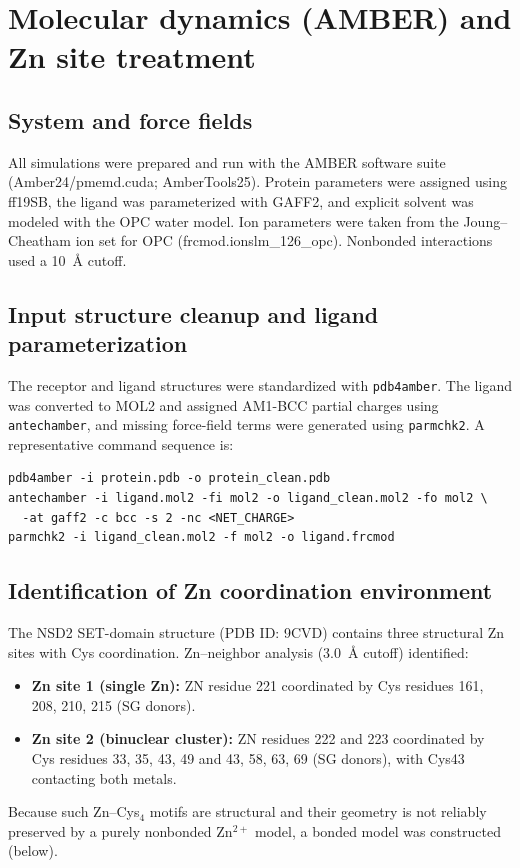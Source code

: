 \section{Molecular dynamics (AMBER) and Zn site treatment}
\label{sec:md-amber-zn}

\subsection{System and force fields}
All simulations were prepared and run with the AMBER software suite (Amber24/pmemd.cuda; AmberTools25). Protein parameters were assigned using ff19SB, the ligand was parameterized with GAFF2, and explicit solvent was modeled with the OPC water model. Ion parameters were taken from the Joung--Cheatham ion set for OPC (frcmod.ionslm\_126\_opc). Nonbonded interactions used a 10~\AA{} cutoff.

\subsection{Input structure cleanup and ligand parameterization}
The receptor and ligand structures were standardized with \texttt{pdb4amber}. The ligand was converted to MOL2 and assigned AM1-BCC partial charges using \texttt{antechamber}, and missing force-field terms were generated using \texttt{parmchk2}. A representative command sequence is:
\begin{verbatim}
pdb4amber -i protein.pdb -o protein_clean.pdb
antechamber -i ligand.mol2 -fi mol2 -o ligand_clean.mol2 -fo mol2 \
  -at gaff2 -c bcc -s 2 -nc <NET_CHARGE>
parmchk2 -i ligand_clean.mol2 -f mol2 -o ligand.frcmod
\end{verbatim}

\subsection{Identification of Zn coordination environment}
The NSD2 SET-domain structure (PDB ID: 9CVD) contains three structural Zn sites with Cys coordination. Zn--neighbor analysis (3.0~\AA{} cutoff) identified:
\begin{itemize}
  \item \textbf{Zn site 1 (single Zn):} ZN residue 221 coordinated by Cys residues 161, 208, 210, 215 (SG donors).
  \item \textbf{Zn site 2 (binuclear cluster):} ZN residues 222 and 223 coordinated by Cys residues 33, 35, 43, 49 and 43, 58, 63, 69 (SG donors), with Cys43 contacting both metals.
\end{itemize}
Because such Zn--Cys$_4$ motifs are structural and their geometry is not reliably preserved by a purely nonbonded Zn$^{2+}$ model, a bonded model was constructed (below).

